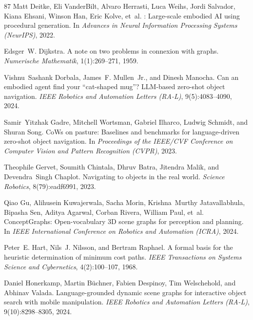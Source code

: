 \documentclass[10pt]{article}
\begin{document}
\begin{thebibliography}{87}
Matt Deitke, Eli VanderBilt, Alvaro Herrasti, Luca Weihs, Jordi Salvador, Kiana Ehsani, Winson Han, Eric Kolve, et~al.
: Large-scale embodied {AI} using procedural generation.
\newblock In \emph{Advances in Neural Information Processing Systems (NeurIPS)}, 2022.

Edsger~W. Dijkstra.
\newblock A note on two problems in connexion with graphs.
\newblock \emph{Numerische Mathematik}, 1(1):269--271, 1959.

Vishnu~Sashank Dorbala, James~F. Mullen~Jr., and Dinesh Manocha.
\newblock Can an embodied agent find your ``cat-shaped mug''? {LLM}-based zero-shot object navigation.
\newblock \emph{IEEE Robotics and Automation Letters (RA-L)}, 9(5):4083--4090, 2024.

Samir~Yitzhak Gadre, Mitchell Wortsman, Gabriel Ilharco, Ludwig Schmidt, and Shuran Song.
\newblock CoWs on pasture: Baselines and benchmarks for language-driven zero-shot object navigation.
\newblock In \emph{Proceedings of the IEEE/CVF Conference on Computer Vision and Pattern Recognition (CVPR)}, 2023.

Theophile Gervet, Soumith Chintala, Dhruv Batra, Jitendra Malik, and Devendra~Singh Chaplot.
\newblock Navigating to objects in the real world.
\newblock \emph{Science Robotics}, 8(79):eadf6991, 2023.

Qiao Gu, Alihusein Kuwajerwala, Sacha Morin, Krishna~Murthy Jatavallabhula, Bipasha Sen, Aditya Agarwal, Corban Rivera, William Paul, et~al.
\newblock ConceptGraphs: Open-vocabulary 3D scene graphs for perception and planning.
\newblock In \emph{IEEE International Conference on Robotics and Automation (ICRA)}, 2024.

Peter~E. Hart, Nils~J. Nilsson, and Bertram Raphael.
\newblock A formal basis for the heuristic determination of minimum cost paths.
\newblock \emph{IEEE Transactions on Systems Science and Cybernetics}, 4(2):100--107, 1968.

Daniel Honerkamp, Martin B{\"u}chner, Fabien Despinoy, Tim Welschehold, and Abhinav Valada.
\newblock Language-grounded dynamic scene graphs for interactive object search with mobile manipulation.
\newblock \emph{IEEE Robotics and Automation Letters (RA-L)}, 9(10):8298--8305, 2024.


\end{thebibliography}
\end{document}
